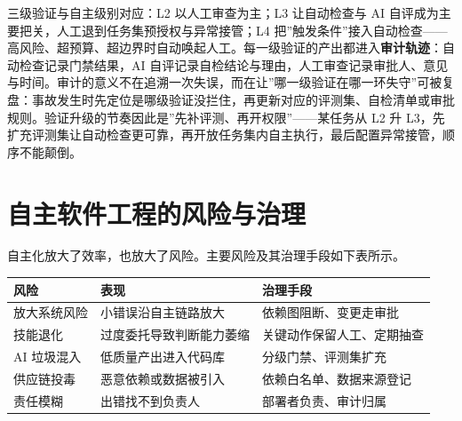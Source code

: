 \documentclass[12pt,a4paper,twoside,openany]{ctexbook}
\numberwithin{figure}{chapter}
\numberwithin{table}{chapter}
\newcounter{none}
\begin{document}
三级验证与自主级别对应：L2 以人工审查为主；L3 让自动检查与 AI
自评成为主要把关，人工退到任务集预授权与异常接管；L4
把''触发条件''接入自动检查------高风险、超预算、超边界时自动唤起人工。每一级验证的产出都进入\textbf{审计轨迹}：自动检查记录门禁结果，AI
自评记录自检结论与理由，人工审查记录审批人、意见与时间。审计的意义不在追溯一次失误，而在让''哪一级验证在哪一环失守''可被复盘：事故发生时先定位是哪级验证没拦住，再更新对应的评测集、自检清单或审批规则。验证升级的节奏因此是''先补评测、再开权限''------某任务从
L2 升
L3，先扩充评测集让自动检查更可靠，再开放任务集内自主执行，最后配置异常接管，顺序不能颠倒。

\section{自主软件工程的风险与治理}\label{ux81eaux4e3bux8f6fux4ef6ux5de5ux7a0bux7684ux98ceux9669ux4e0eux6cbbux7406}

自主化放大了效率，也放大了风险。主要风险及其治理手段如下表所示。

{\def\LTcaptype{none} %
\begin{longtable}[]{@{}lll@{}}
\toprule\noalign{}
风险 & 表现 & 治理手段 \\
\midrule\noalign{}
\endhead
\bottomrule\noalign{}
\endlastfoot
放大系统风险 & 小错误沿自主链路放大 & 依赖图阻断、变更走审批 \\
技能退化 & 过度委托导致判断能力萎缩 & 关键动作保留人工、定期抽查 \\
AI 垃圾混入 & 低质量产出进入代码库 & 分级门禁、评测集扩充 \\
供应链投毒 & 恶意依赖或数据被引入 & 依赖白名单、数据来源登记 \\
责任模糊 & 出错找不到负责人 & 部署者负责、审计归属 \\
\end{longtable}
}
\end{document}
